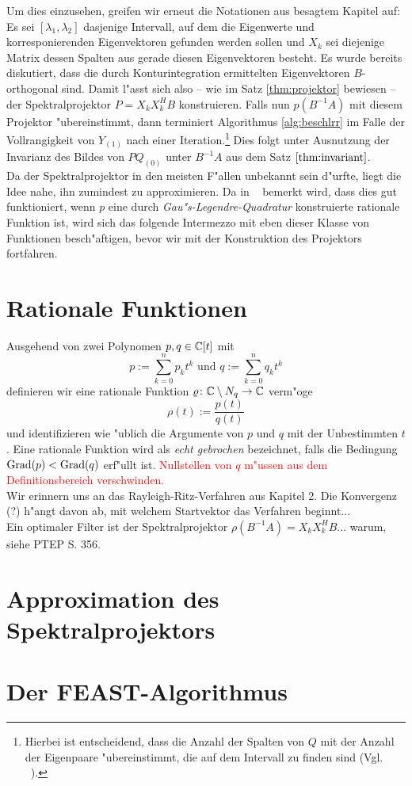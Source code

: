 Um dies einzusehen, greifen wir erneut die Notationen aus besagtem Kapitel auf:
Es sei $[\lambda_1, \lambda_2]$ dasjenige Intervall, auf dem die Eigenwerte und
korresponierenden Eigenvektoren gefunden werden sollen und $X_k$ sei diejenige
Matrix dessen Spalten aus gerade diesen Eigenvektoren besteht. Es wurde bereits
diskutiert, dass die durch Konturintegration ermittelten Eigenvektoren
$B$-orthogonal sind. Damit l"asst sich also -- wie im Satz \ref{thm:projektor}
bewiesen -- der Spektralprojektor $P = X_k X_k^H B$ konstruieren. Falls nun
$p(B^{-1}A)$ mit diesem Projektor "ubereinstimmt, dann terminiert Algorithmus
\ref{alg:beschlrr} im Falle der Vollrangigkeit von $Y_{(1)}$ nach einer Iteration.\footnote{
Hierbei ist entscheidend, dass die Anzahl der Spalten von $Q$ mit der Anzahl der
Eigenpaare "ubereinstimmt, die auf dem Intervall zu finden sind (Vgl. ~\cite[356]{ptep}).}
Dies folgt unter Ausnutzung der Invarianz des Bildes von $PQ_{(0)}$ unter $B^{-1}A$
aus dem Satz $\ref{thm:invariant}$.\\

Da der Spektralprojektor in den meisten F"allen unbekannt sein d"urfte, liegt
die Idee nahe, ihn zumindest zu approximieren. Da in ~\cite[356]{ptep} bemerkt wird,
dass dies gut funktioniert, wenn $p$ eine durch \emph{Gau"s-Legendre-Quadratur}
konstruierte rationale Funktion ist, wird sich das folgende Intermezzo mit eben dieser
Klasse von Funktionen besch"aftigen, bevor wir mit der Konstruktion des Projektors
fortfahren.


\section{Rationale Funktionen}

Ausgehend von zwei Polynomen $p, q\in\mathbb{C} [t]$ mit
\[
p := \sum_{k=0}^n p_k t^k \text{ \ und\ } q := \sum_{k=0}^n q_k t^k
\]
definieren wir eine rationale Funktion $\varrho\colon\mathbb{C}\setminus{N_q}\to\mathbb{C}$ verm"oge
\[
\rho(t) := \frac{p(t)}{q(t)}
\]
und identifizieren wie "ublich die Argumente von $p$ und $q$ mit der Unbestimmten $t$.
Eine rationale Funktion wird als \emph{echt gebrochen} bezeichnet, falls die
Bedingung $\operatorname{Grad}(p) < \operatorname{Grad}(q)$ erf"ullt ist.
\textcolor{red}{Nullstellen von $q$ m"ussen aus dem Definitionsbereich verschwinden.}\\

Wir erinnern uns an das Rayleigh-Ritz-Verfahren aus Kapitel 2. Die Konvergenz (?)
h"angt davon ab, mit welchem Startvektor das Verfahren beginnt...\\

Ein optimaler Filter ist der Spektralprojektor $\rho(B^{-1}A) = X_k X_k^H B$... warum, siehe PTEP S. 356.


\section{Approximation des Spektralprojektors}

\section{Der FEAST-Algorithmus}
